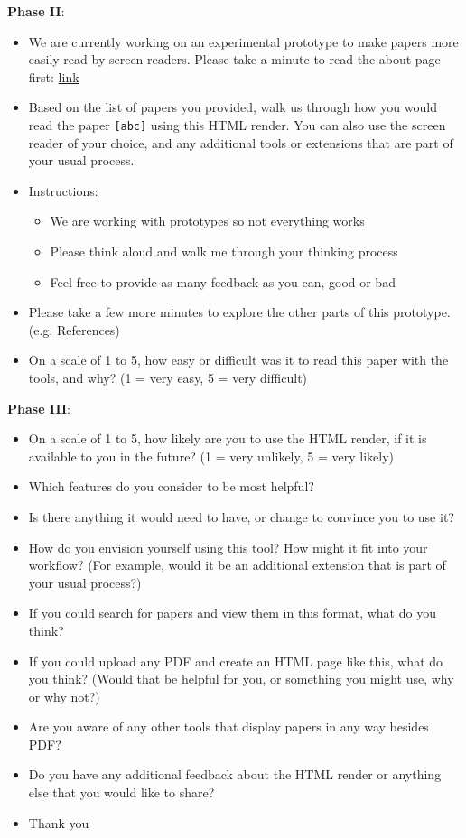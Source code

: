 \textbf{Phase II}:
\begin{itemize}
    \item We are currently working on an experimental prototype to make papers more easily read by screen readers. Please take a minute to read the about page first: \underline{link}
    \item Based on the list of papers you provided, walk us through how you would read the paper \texttt{[abc]} using this HTML render. You can also use the screen reader of your choice, and any additional tools or extensions that are part of your usual process.
    \item Instructions: 
    \begin{itemize}
        \item We are working with prototypes so not everything works
        \item Please think aloud and walk me through your thinking process
        \item Feel free to provide as many feedback as you can, good or bad
    \end{itemize}
    \item Please take a few more minutes to explore the other parts of this prototype. (e.g. References)
    \item On a scale of 1 to 5, how easy or difficult was it to read this paper with the tools, and why? (1 = very easy, 5 = very difficult)
\end{itemize}

\textbf{Phase III}:
\begin{itemize}
    \item On a scale of 1 to 5, how likely are you to use the HTML render, if it is available to you in the future? (1 = very unlikely, 5 = very likely)
    \item Which features do you consider to be most helpful?
    \item Is there anything it would need to have, or change to convince you to use it?
    \item How do you envision yourself using this tool? How might it fit into your workflow? (For example, would it be an additional extension that is part of your usual process?) 
    \item If you could search for papers and view them in this format, what do you think? 
    \item If you could upload any PDF and create an HTML page like this, what do you think? (Would that be helpful for you, or something you might use, why or why not?)
    \item Are you aware of any other tools that display papers in any way besides PDF?
    \item Do you have any additional feedback about the HTML render or anything else that you would like to share?
    \item Thank you
\end{itemize}